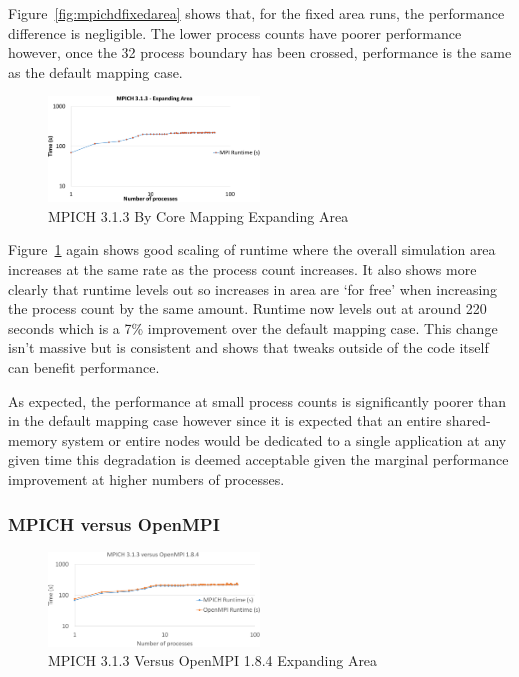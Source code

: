 Figure~\ref{fig:mpichdfixedarea} shows that, for the fixed area runs, the
performance difference is negligible. The lower process counts have poorer
performance however, once the 32 process boundary has been crossed, performance
is the same as the default mapping case.

\begin{figure}
    \includegraphics[page=1,width=0.5\textwidth]
    {graphs/MPICH313-by-core-mapping-expanding-area-crop.pdf}
    \caption{MPICH 3.1.3 By Core Mapping Expanding Area}
    \label{fig:mpichbycoremappingexpandingarea}
\end{figure}

Figure~\ref{fig:mpichbycoremappingexpandingarea} again shows good scaling of
runtime where the overall simulation area increases at the same rate as the
process count increases. It also shows more clearly that runtime levels out so
increases in area are `for free' when increasing the process count by the same
amount. Runtime now levels out at around 220 seconds which is a 7\% improvement
over the default mapping case. This change isn't massive but is consistent and
shows that tweaks outside of the code itself can benefit performance.

As expected, the performance at small process counts is significantly poorer
than in the default mapping case however since it is expected that an entire
shared-memory system or entire nodes would be dedicated to a single application
at any given time this degradation is deemed acceptable given the marginal
performance improvement at higher numbers of processes.

\subsubsection{MPICH versus OpenMPI}

\begin{figure}
    \includegraphics[page=1,width=0.5\textwidth]
    {graphs/MPICH313-versus-OpenMPI184-crop.pdf}
    \caption{MPICH 3.1.3 Versus OpenMPI 1.8.4 Expanding Area}
    \label{fig:mpichversusopenmpiexpandingarea}
\end{figure}

